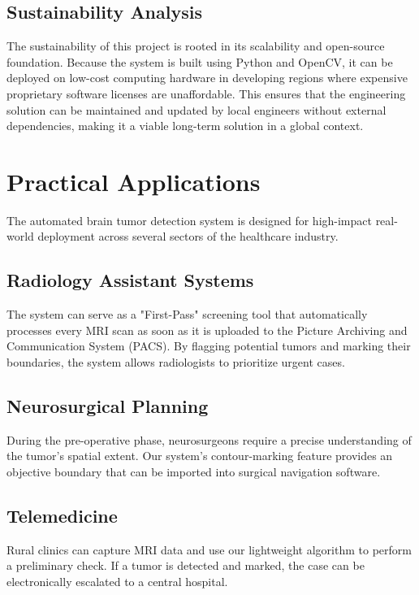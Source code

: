 \documentclass[12pt,a4paper,oneside]{report}
\begin{document}
\newpage
\section{Sustainability Analysis}
The sustainability of this project is rooted in its scalability and open-source foundation. Because the system is built using Python and OpenCV, it can be deployed on low-cost computing hardware in developing regions where expensive proprietary software licenses are unaffordable. This ensures that the engineering solution can be maintained and updated by local engineers without external dependencies, making it a viable long-term solution in a global context.

\chapter{Practical Applications}
The automated brain tumor detection system is designed for high-impact real-world deployment across several sectors of the healthcare industry.

\section{Radiology Assistant Systems}
The system can serve as a "First-Pass" screening tool that automatically processes every MRI scan as soon as it is uploaded to the Picture Archiving and Communication System (PACS). By flagging potential tumors and marking their boundaries, the system allows radiologists to prioritize urgent cases.

\section{Neurosurgical Planning}
During the pre-operative phase, neurosurgeons require a precise understanding of the tumor’s spatial extent. Our system’s contour-marking feature provides an objective boundary that can be imported into surgical navigation software.

\section{Telemedicine}
Rural clinics can capture MRI data and use our lightweight algorithm to perform a preliminary check. If a tumor is detected and marked, the case can be electronically escalated to a central hospital.
\end{document}
